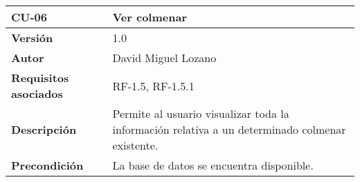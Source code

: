 \begin{longtable}[H]{@{}ll@{}}
\toprule
\begin{minipage}[b]{0.268\columnwidth}\raggedright\strut
\textbf{CU-06}\strut
\end{minipage} & \begin{minipage}[b]{0.76\columnwidth}\raggedright\strut
\textbf{Ver colmenar}\strut
\end{minipage}\tabularnewline
\midrule
\endhead
\begin{minipage}[t]{0.268\columnwidth}\raggedright\strut
\textbf{Versión}\strut
\end{minipage} & \begin{minipage}[t]{0.76\columnwidth}\raggedright\strut
1.0\strut
\end{minipage}\tabularnewline
\begin{minipage}[t]{0.268\columnwidth}\raggedright\strut
\textbf{Autor}\strut
\end{minipage} & \begin{minipage}[t]{0.76\columnwidth}\raggedright\strut
David Miguel Lozano\strut
\end{minipage}\tabularnewline
\begin{minipage}[t]{0.268\columnwidth}\raggedright\strut
\textbf{Requisitos asociados}\strut
\end{minipage} & \begin{minipage}[t]{0.76\columnwidth}\raggedright\strut
RF-1.5, RF-1.5.1\strut
\end{minipage}\tabularnewline
\begin{minipage}[t]{0.268\columnwidth}\raggedright\strut
\textbf{Descripción}\strut
\end{minipage} & \begin{minipage}[t]{0.76\columnwidth}\raggedright\strut
Permite al usuario visualizar toda la información relativa a un
determinado colmenar existente.\strut
\end{minipage}\tabularnewline
\begin{minipage}[t]{0.268\columnwidth}\raggedright\strut
\textbf{Precondición}\strut
\end{minipage} & \begin{minipage}[t]{0.76\columnwidth}\raggedright\strut
La base de datos se encuentra disponible.


\end{minipage}
\end{longtable}
